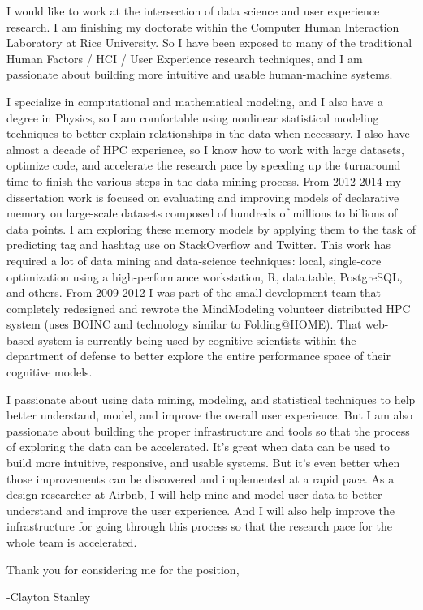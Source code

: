 \documentclass{article}
\begin{document}
I would like to work at the intersection of data science and user experience research.
I am finishing my doctorate within the Computer Human Interaction Laboratory at Rice University.
So I have been exposed to many of the traditional Human Factors / HCI / User Experience research techniques, and I am passionate about building more intuitive and usable human-machine systems.

I specialize in computational and mathematical modeling, and I also have a degree in Physics, so I am comfortable using nonlinear statistical modeling techniques to better explain relationships in the data when necessary.
I also have almost a decade of HPC experience, so I know how to work with large datasets, optimize code,
and accelerate the research pace by speeding up the turnaround time to finish the various steps in the data mining process. 
From 2012-2014 my dissertation work is focused on evaluating and improving models of declarative memory on large-scale datasets composed of hundreds of millions to billions of data points.
I am exploring these memory models by applying them to the task of predicting tag and hashtag use on StackOverflow and Twitter.
This work has required a lot of data mining and data-science techniques: local, single-core optimization using a high-performance workstation, R, data.table, PostgreSQL, and others.
From 2009-2012 I was part of the small development team that completely redesigned and rewrote the MindModeling volunteer distributed HPC system (uses BOINC and technology similar to Folding@HOME).
That web-based system is currently being used by cognitive scientists within the department of defense to better explore the entire performance space of their cognitive models.

I passionate about using data mining, modeling, and statistical techniques to help better understand, model, and improve the overall user experience. 
But I am also passionate about building the proper infrastructure and tools so that the process of exploring the data can be accelerated.
It's great when data can be used to build more intuitive, responsive, and usable systems.
But it's even better when those improvements can be discovered and implemented at a rapid pace.
As a design researcher at Airbnb, I will help mine and model user data to better understand and improve the user experience.
And I will also help improve the infrastructure for going through this process so that the research pace for the whole team is accelerated.

Thank you for considering me for the position,

-Clayton Stanley
\end{document}
